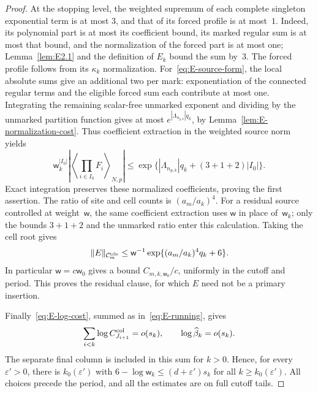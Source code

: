 \begin{proof}
At the stopping level, the weighted supremum of each complete singleton exponential term is at most $3$, and that of its forced profile is at most~$1$. Indeed, its polynomial part is at most its coefficient bound, its marked regular sum is at most that bound, and the normalization of the forced part is at most one; Lemma~\ref{lem:E2.1} and the definition of $E_k$ bound the sum by~$3$. The forced profile follows from its $\kappa_k$ normalization. For~\eqref{eq:E-source-form}, the local absolute sums give an additional two per mark: exponentiation of the connected regular terms and the eligible forced sum each contribute at most one. Integrating the remaining scalar-free unmarked exponent and dividing by the unmarked partition function gives at most $e^{|\Lambda_{n_{p,k}}|q_k}$, by Lemma~\ref{lem:E-normalization-cost}. Thus coefficient extraction in the weighted source norm yields
\begin{equation*}
 \mathsf w_k^{|I_0|}\left|\left\langle\prod_{i\in I_0}F_i\right\rangle_{N,p}\right|
 \le\exp\{|\Lambda_{n_{p,k}}|q_k+(3+1+2)|I_0|\}.
\end{equation*}
Exact integration preserves these normalized coefficients, proving the first assertion. The ratio of site and cell counts is $(a_m/a_k)^4$. For a residual source controlled at weight~$\mathsf w$, the same coefficient extraction uses $\mathsf w$ in place of~$\mathsf w_k$; only the bounds $3+1+2$ and the unmarked ratio enter this calculation. Taking the cell root gives
\begin{equation}\label{eq:E-residual-root}
 \|E\|_{\mathcal C^{\rm tile}_m}
 \le \mathsf w^{-1}\exp\{(a_m/a_k)^4q_k+6\}.
\end{equation}
In particular $\mathsf w=c\mathsf w_0$ gives a bound $C_{m,k,\mathsf w_0}/c$, uniformly in the cutoff and period. This proves the residual clause, for which $E$ need not be a primary insertion.

Finally~\eqref{eq:E-log-cost}, summed as in~\eqref{eq:E-running}, gives
\begin{equation*}
 \sum_{i<k}\log C^{\rm col}_{J_{i+1}}=o(s_k),\qquad
 \log\widehat\beta_k=o(s_k).
\end{equation*}
The separate final column is included in this sum for $k>0$. Hence, for every $\varepsilon'>0$, there is $k_0(\varepsilon')$ with $6-\log\mathsf w_k\le(d+\varepsilon')s_k$ for all $k\ge k_0(\varepsilon')$. All choices precede the period, and all the estimates are on full cutoff tails.
\end{proof}
